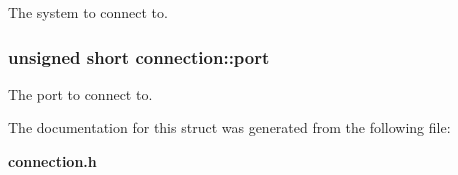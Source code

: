 The system to connect to. 
\subsubsection{\setlength{\rightskip}{0pt plus 5cm}unsigned short {\bf connection::port}}\label{structconnection_538318a162eb3435e9cea3f6c073d522}


The port to connect to. 

The documentation for this struct was generated from the following file:\begin{CompactItemize}
\item 
{\bf connection.h}\end{CompactItemize}
